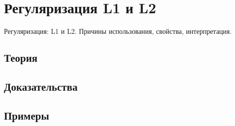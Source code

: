 
\section{Регуляризация L1 и L2}
\label{sec:1.4.03-regularization}

\begin{ticket}
Регуляризация: L1 и L2. Причины использования, свойства, интерпретация.
\end{ticket}

\subsection*{Теория}

\subsection*{Доказательства}

\subsection*{Примеры}

